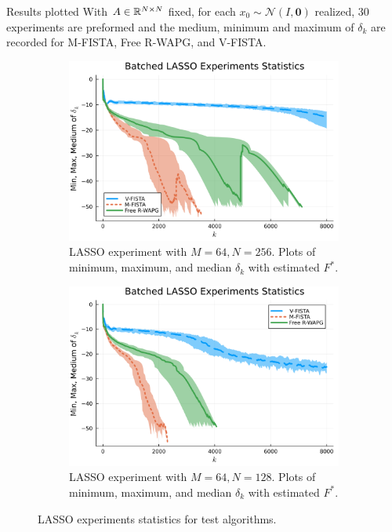 \documentclass[11pt]{beamer}
\theoremstyle{definition}
\begin{document}
        \begin{frame}{Results plotted}
            With $A\in \mathbb R^{N\times N}$ fixed, for each $x_0 \sim \mathcal N(I, \mathbf 0)$ realized, 30 experiments are preformed and the medium, minimum and maximum of $\delta_k$ are recorded for M-FISTA, Free R-WAPG, and V-FISTA. 
            \begin{figure}[H]
                \begin{subfigure}[b]{0.47\textwidth}
                    \centering
                    \includegraphics[width=\textwidth]{assets/lasso_batched_statistics_64-256.png}
                    \caption{LASSO experiment with $M = 64, N = 256$. Plots of minimum, maximum, and median $\delta_k$ with estimated $F^*$. }
                \end{subfigure}
                \hfill
                \begin{subfigure}[b]{0.47\textwidth}
                    \centering
                    \includegraphics[width=\textwidth]{assets/lasso_batched_statistics_64-128.png}
                    \caption{LASSO experiment with $M = 64, N = 128$. Plots of minimum, maximum, and median $\delta_k$ with estimated $F^*$. }
                \end{subfigure}
                \caption{LASSO experiments statistics for test algorithms. }
                \label{fig:batched-lasso}
            \end{figure}
        \end{frame}
\end{document}
